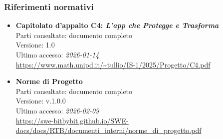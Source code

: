 \documentclass[a4paper,12pt]{article}
\begin{document}
\subsubsection{Riferimenti normativi}\label{sec:riferimenti_normativi}
\begin{itemize}
\item \textbf{Capitolato d'appalto C4: \emph{L'app che Protegge e Trasforma}}\\
Parti consultate: documento completo\\
Versione: 1.0\\
Ultimo accesso: \textit{2026-01-14}\\
\url{https://www.math.unipd.it/~tullio/IS-1/2025/Progetto/C4.pdf}

\pagebreak %

\item \textbf{Norme di Progetto}\\
Parti consultate: documento completo\\
Versione: v.1.0.0\\
Ultimo accesso: \textit{2026-02-09}\\
\url{https://swe-bitbybit.github.io/SWE-docs/docs/RTB/documenti_interni/norme_di_progetto.pdf} %
\end{itemize}
\end{document}
